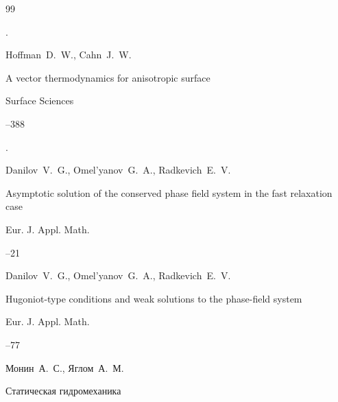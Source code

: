 \begin{thebibliography}{99}

\moreref 

.\nofrills




\by Hoffman~D.~W., Cahn~J.~W.

\paper A vector thermodynamics for anisotropic surface

\jour Surface Sciences



--388


\moreref {}. \nofrills






\by Danilov~V.~G., Omel'yanov~G.~A., Radkevich~E.~V.

\paper Asymptotic solution of the conserved phase field system in the fast relaxation case

\jour Eur. J. Appl. Math.




--21





\by Danilov~V.~G., Omel'yanov~G.~A., Radkevich~E.~V.

\paper Hugoniot-type conditions and weak solutions to the phase-field system

\jour Eur. J. Appl. Math.




--77









\by Монин~А.~С., Яглом~А.~М.

\book Статическая гидромеханика


\end{thebibliography}
